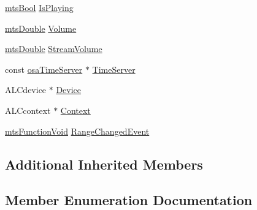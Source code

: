 \begin{DoxyCompactItemize}
\item 
\hyperlink{mts_generic_object_proxy_8h_ae2e26261f1874d4aa4ee374ece7646bd}{mts\+Bool} \hyperlink{classmts_open_a_l_play_a0d76e2f8d1f2223b008550b061954162}{Is\+Playing}
\item 
\hyperlink{mts_generic_object_proxy_8h_a31e76b0190a8d3f9838626cd7b47bd75}{mts\+Double} \hyperlink{classmts_open_a_l_play_aaebfc63c5f4cc5d7b6ce8cd803ddfef2}{Volume}
\item 
\hyperlink{mts_generic_object_proxy_8h_a31e76b0190a8d3f9838626cd7b47bd75}{mts\+Double} \hyperlink{classmts_open_a_l_play_a2def7fb60be825801cbf4a4e7862d7bc}{Stream\+Volume}
\item 
const \hyperlink{classosa_time_server}{osa\+Time\+Server} $\ast$ \hyperlink{classmts_open_a_l_play_ae7df403a9ca556114dcc51164ac96fb4}{Time\+Server}
\item 
A\+L\+Cdevice $\ast$ \hyperlink{classmts_open_a_l_play_a788253f5c250b5ae925377ff99d9f464}{Device}
\item 
A\+L\+Ccontext $\ast$ \hyperlink{classmts_open_a_l_play_a47760c4ccad48177879a14ae4ae7d01f}{Context}
\item 
\hyperlink{classmts_function_void}{mts\+Function\+Void} \hyperlink{classmts_open_a_l_play_ab558a1c0122897729cc801df40bd0760}{Range\+Changed\+Event}
\end{DoxyCompactItemize}
\subsection*{Additional Inherited Members}


\subsection{Member Enumeration Documentation}
\hypertarget{classmts_open_a_l_play_a69403fe8d56192bf43c92ead689f4cf7}{}

